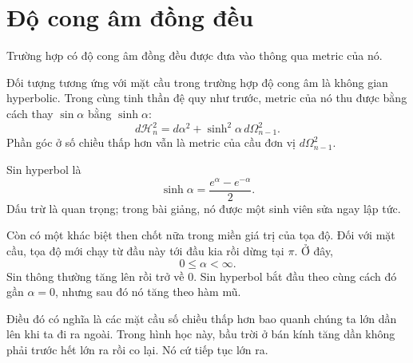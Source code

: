 \begin{classroomqa}
\end{classroomqa}

\section{Độ cong âm đồng đều}

Trường hợp có độ cong âm đồng đều được đưa vào thông qua metric của nó.

Đối tượng tương ứng với mặt cầu trong trường hợp độ cong âm là không gian hyperbolic. Trong cùng tinh thần đệ quy như trước, metric của nó thu được bằng cách thay \(\sin\alpha\) bằng \(\sinh\alpha\):
\begin{equation}
d\mathcal H_n^2=d\alpha^2+\sinh^2\alpha\,d\Omega_{n-1}^2.
\end{equation}
Phần góc ở số chiều thấp hơn vẫn là metric của cầu đơn vị \(d\Omega_{n-1}^2\).

\begin{classroomqa}
\end{classroomqa}

Sin hyperbol là
\begin{equation}
\sinh\alpha=\frac{e^\alpha-e^{-\alpha}}{2}.
\end{equation}
Dấu trừ là quan trọng; trong bài giảng, nó được một sinh viên sửa ngay lập tức.

Còn có một khác biệt then chốt nữa trong miền giá trị của tọa độ. Đối với mặt cầu, tọa độ mới chạy từ đầu này tới đầu kia rồi dừng tại \(\pi\). Ở đây,
\begin{equation}
0\leq \alpha<\infty.
\end{equation}
Sin thông thường tăng lên rồi trở về 0. Sin hyperbol bắt đầu theo cùng cách đó gần \(\alpha=0\), nhưng sau đó nó tăng theo hàm mũ.

Điều đó có nghĩa là các mặt cầu số chiều thấp hơn bao quanh chúng ta lớn dần lên khi ta đi ra ngoài. Trong hình học này, bầu trời ở bán kính tăng dần không phải trước hết lớn ra rồi co lại. Nó cứ tiếp tục lớn ra.

